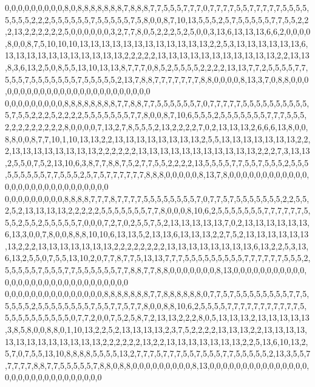 0,0,0,0,0,0,0,0,0,8,0,8,8,8,8,8,8,8,7,8,8,8,7,7,5,5,5,7,7,7,0,7,7,7,7,5,5,7,7,7,7,7,5,5,5,5,5,5,5,5,2,2,2,5,5,5,5,5,5,7,5,5,5,5,5,7,5,8,0,0,8,7,10,13,5,5,5,2,5,7,5,5,5,5,5,7,7,5,5,2,2,2,13,2,2,2,2,2,2,5,0,0,0,0,0,0,3,2,7,7,8,0,5,2,2,2,5,2,5,0,0,3,13,6,13,13,13,6,6,2,0,0,0,0,8,0,0,8,7,5,10,10,10,13,13,13,13,13,13,13,13,13,13,13,13,2,2,5,3,13,13,13,13,13,13,6,13,13,13,13,13,13,13,13,13,13,13,2,2,2,2,2,13,13,13,13,13,13,13,13,13,13,13,2,2,13,13,8,3,6,13,2,5,0,8,5,5,13,10,13,13,8,7,7,7,0,8,5,2,5,5,5,5,2,2,2,2,13,13,7,7,2,5,5,5,5,7,7,5,5,5,7,5,5,5,5,5,5,5,7,5,5,5,5,5,2,13,7,8,8,7,7,7,7,7,7,7,8,8,0,0,0,0,8,13,3,7,0,8,8,0,0,0,0,0,0,0,0,0,0,0,0,0,0,0,0,0,0,0,0,0,0,0,0,0
0,0,0,0,0,0,0,0,0,8,8,8,8,8,8,8,8,7,7,8,8,7,7,5,5,5,5,5,5,7,0,7,7,7,7,7,5,5,5,5,5,5,5,5,5,5,5,7,5,5,2,2,2,5,2,2,2,2,5,5,5,5,5,5,5,7,7,8,0,0,8,7,10,6,5,5,5,2,5,5,5,5,5,5,5,7,7,7,5,5,5,2,2,2,2,2,2,2,2,2,8,0,0,0,0,7,13,2,7,8,5,5,5,2,13,2,2,2,2,7,0,2,13,13,13,2,6,6,6,13,8,0,0,8,8,0,0,8,7,7,10,1,10,13,13,2,2,13,13,13,13,13,13,13,13,2,5,5,13,13,13,13,13,13,13,2,2,2,13,13,13,13,13,13,13,13,2,2,2,2,2,2,13,13,13,13,13,13,13,13,13,13,13,2,2,2,7,3,13,13,2,5,5,0,7,5,2,13,10,6,3,8,7,7,8,8,7,5,2,7,7,5,5,2,2,2,2,13,5,5,5,5,7,7,5,5,7,5,5,5,2,5,5,5,5,5,5,5,5,5,7,7,5,5,5,2,5,7,5,7,7,7,7,7,7,8,8,8,0,0,0,0,0,8,13,7,8,0,0,0,0,0,0,0,0,0,0,0,0,0,0,0,0,0,0,0,0,0,0,0,0,0,0,0,0
0,0,0,0,0,0,0,0,0,8,8,8,8,7,7,7,8,7,7,7,7,5,5,5,5,5,5,5,5,7,0,7,7,5,7,5,5,5,5,5,5,5,2,2,5,5,2,5,2,13,13,13,13,2,2,2,2,2,5,5,5,5,5,5,5,7,7,8,0,0,0,8,10,6,2,5,5,5,5,5,5,5,7,7,7,7,7,7,5,5,5,2,5,5,2,5,5,5,5,5,7,0,0,0,7,2,7,0,2,5,5,7,5,2,13,13,13,13,13,7,0,2,13,13,13,13,13,13,6,13,3,0,0,7,8,0,0,8,8,8,10,10,6,13,13,5,2,13,13,6,13,13,13,2,2,7,5,2,13,13,13,13,13,13,13,2,2,2,13,13,13,13,13,13,13,2,2,2,2,2,2,2,2,13,13,13,13,13,13,13,13,6,13,2,2,5,3,13,6,13,2,5,5,0,7,5,5,13,10,2,0,7,7,8,7,7,5,13,13,7,7,7,5,5,5,5,5,5,5,5,5,7,7,7,7,7,7,5,5,5,2,5,5,5,5,5,7,5,5,5,7,7,5,5,5,5,5,5,7,7,8,8,7,7,8,8,0,0,0,0,0,0,0,8,13,0,0,0,0,0,0,0,0,0,0,0,0,0,0,0,0,0,0,0,0,0,0,0,0,0,0,0,0,0,0
0,0,0,0,0,0,0,0,0,0,0,0,0,0,0,8,8,8,8,8,8,8,7,7,8,8,8,8,8,8,0,7,7,5,7,5,5,5,5,5,5,5,5,7,7,5,5,5,5,5,2,5,5,5,5,5,5,5,5,7,5,5,7,7,5,7,7,8,0,0,8,8,10,6,2,5,5,5,5,7,7,7,7,7,7,7,7,7,7,7,5,5,5,5,5,5,5,5,5,5,5,0,7,7,2,0,0,7,5,2,5,8,7,2,13,13,2,2,2,8,0,5,13,13,13,2,13,13,13,13,13,3,8,5,8,0,0,8,8,0,1,10,13,2,2,5,2,13,13,13,13,2,3,7,5,2,2,2,2,13,13,13,2,2,13,13,13,13,13,13,13,13,13,13,13,13,13,2,2,2,2,2,2,13,2,2,13,13,13,13,13,13,13,2,2,5,13,6,10,13,2,5,7,0,7,5,5,13,10,8,8,8,8,5,5,5,5,13,2,7,7,7,5,7,7,7,5,5,7,5,5,5,7,7,5,5,5,5,5,2,13,3,5,5,7,7,7,7,7,8,8,7,7,5,5,5,5,5,7,8,8,0,8,8,0,0,0,0,0,0,0,0,0,8,13,0,0,0,0,0,0,0,0,0,0,0,0,0,0,0,0,0,0,0,0,0,0,0,0,0,0,0,0,0,0
